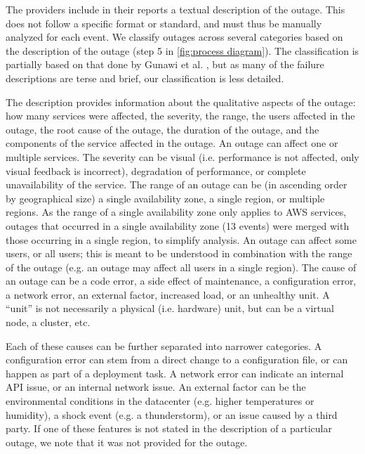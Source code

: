 The providers include in their reports a textual description of the outage.
This does not follow a specific format or standard, and must thus be manually analyzed for each event.
We classify outages across several categories based on the description of the outage (step 5 in \autoref{fig:process diagram}).
The classification is partially based on that done by Gunawi et al. \cite{gunawi2016, gunawi2014}, but as many of the failure descriptions are terse and brief, our classification is less detailed.

The description provides information about the qualitative aspects of the outage: how many services were affected, the severity, the range, the users affected in the outage, the root cause of the outage, the duration of the outage, and the components of the service affected in the outage.
An outage can affect one or multiple services.
The severity can be visual (i.e. performance is not affected, only visual feedback is incorrect), degradation of performance, or complete unavailability of the service.
The range of an outage can be (in ascending order by geographical size) a single availability zone, a single region, or multiple regions.
As the range of a single availability zone only applies to AWS services, outages that occurred in a single availability zone (13 events) were merged with those occurring in a single region, to simplify analysis.
An outage can affect some users, or all users; this is meant to be understood in combination with the range of the outage (e.g. an outage may affect all users in a single region).
The cause of an outage can be a code error, a side effect of maintenance, a configuration error, a network error, an external factor, increased load, or an unhealthy unit.
A ``unit'' is not necessarily a physical (i.e. hardware) unit, but can be a virtual node, a cluster, etc.

Each of these causes can be further separated into narrower categories.
A configuration error can stem from a direct change to a configuration file, or can happen as part of a deployment task.
A network error can indicate an internal API issue, or an internal network issue.
An external factor can be the environmental conditions in the datacenter (e.g. higher temperatures or humidity), a shock event (e.g. a thunderstorm), or an issue caused by a third party.
If one of these features is not stated in the description of a particular outage, we note that it was not provided for the outage.
